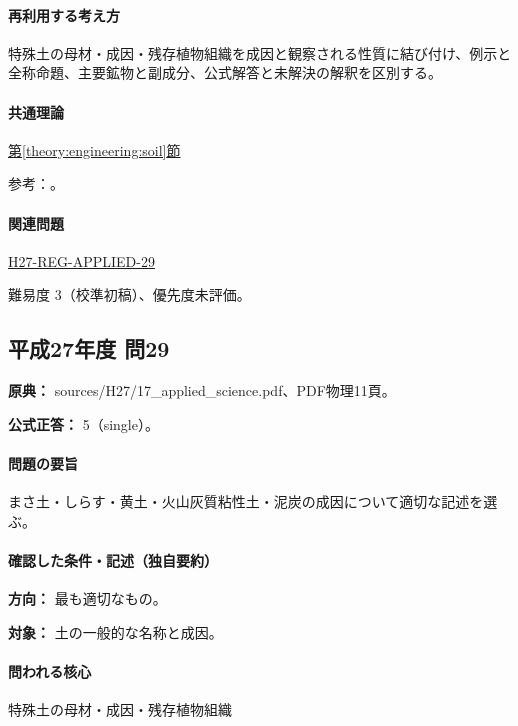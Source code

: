 \paragraph{再利用する考え方} 特殊土の母材・成因・残存植物組織を成因と観察される性質に結び付け、例示と全称命題、主要鉱物と副成分、公式解答と未解決の解釈を区別する。

\paragraph{共通理論} \hyperref[theory:engineering:soil]{第\ref*{theory:engineering:soil}節}

\par 参考：\cite{mlit_masa,maff_shiras2017,mlit_peat,gsj_loess2002}。

\paragraph{関連問題} \hyperref[q:h27-reg-applied-29]{H27-REG-APPLIED-29}

\par 難易度 3（校準初稿）、優先度未評価。

\subsection{平成27年度 問29}
\label{q:h27-reg-applied-29}

\noindent\textbf{原典：} sources/H27/17\_applied\_science.pdf、PDF物理11頁。

\textbf{公式正答：} 5（single）。

\paragraph{問題の要旨} まさ土・しらす・黄土・火山灰質粘性土・泥炭の成因について適切な記述を選ぶ。

\paragraph{確認した条件・記述（独自要約）}\mbox{}\par

\noindent\textbf{方向：} 最も適切なもの。\par

\noindent\textbf{対象：} 土の一般的な名称と成因。\par

\paragraph{問われる核心} 特殊土の母材・成因・残存植物組織

